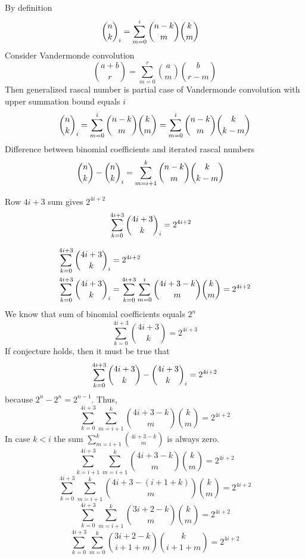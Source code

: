 ﻿By definition
\begin{align}
    \binom{n}{k}_{i} &= \sum_{m=0}^{i} \binom{n-k}{m} \binom{k}{m}
\end{align}
Consider Vandermonde convolution
\begin{equation*}
    \binom{a+b}{r} = \sum_{m=0}^{r} \binom{a}{m} \binom{b}{r-m}
\end{equation*}
Then generalized rascal number is partial case of Vandermonde convolution with upper summation bound equals $i$
\begin{equation*}
    \binom{n}{k}_{i} = \sum_{m=0}^{i} \binom{n-k}{m} \binom{k}{m} = \sum_{m=0}^{i} \binom{n-k}{m} \binom{k}{k-m}
\end{equation*}
Difference between binomial coefficients and iterated rascal numbers
\begin{align*}
    \binom{n}{k} - \binom{n}{k}_{i} &= \sum_{m=i+1}^{k} \binom{n-k}{m} \binom{k}{k-m}
\end{align*}
\begin{proposition}
    Row $4i+3$ sum gives $2^{4i+2}$
    \begin{align*}
        \sum_{k=0}^{4i+3} \binom{4i+3}{k}_{i} &= 2^{4i+2}
    \end{align*}
\end{proposition}
\begin{align*}
    \sum_{k=0}^{4i+3} \binom{4i+3}{k}_{i} &= 2^{4i+2} \\
    \sum_{k=0}^{4i+3} \binom{4i+3}{k}_{i} &= \sum_{k=0}^{4i+3} \sum_{m=0}^{i} \binom{4i+3-k}{m} \binom{k}{m} = 2^{4i+2}
\end{align*}
We know that sum of binomial coefficients equals $2^n$
\begin{equation*}
    \sum_{k=0}^{4i+3} \binom{4i+3}{k}  = 2^{4i+3}
\end{equation*}
If conjecture holds, then it must be true that
\begin{equation*}
    \sum_{k=0}^{4i+3} \binom{4i+3}{k} - \binom{4i+3}{k}_{i} = 2^{4i+2}
\end{equation*}
because $2^n - 2^n = 2^{n-1}$.
Thus,
\begin{equation*}
    \sum_{k=0}^{4i+3} \sum_{m=i+1}^{k} \binom{4i+3-k}{m} \binom{k}{m} = 2^{4i+2}
\end{equation*}
In case $k<i$ the sum $\sum_{m=i+1}^{k} \binom{4i+3-k}{m}$ is always zero.
\begin{equation*}
    \sum_{k=i+1}^{4i+3} \sum_{m=i+1}^{k} \binom{4i+3-k}{m} \binom{k}{m} = 2^{4i+2}
\end{equation*}
\begin{equation*}
    \sum_{k=0}^{4i+3} \sum_{m=i+1}^{k} \binom{4i+3-(i+1+k)}{m} \binom{k}{m} = 2^{4i+2}
\end{equation*}
\begin{equation*}
    \sum_{k=0}^{4i+3} \sum_{m=i+1}^{k} \binom{3i+2-k}{m} \binom{k}{m} = 2^{4i+2}
\end{equation*}
\begin{equation*}
    \sum_{k=0}^{4i+3} \sum_{m=0}^{k} \binom{3i+2-k}{i+1+m} \binom{k}{i+1+m} = 2^{4i+2}
\end{equation*}
